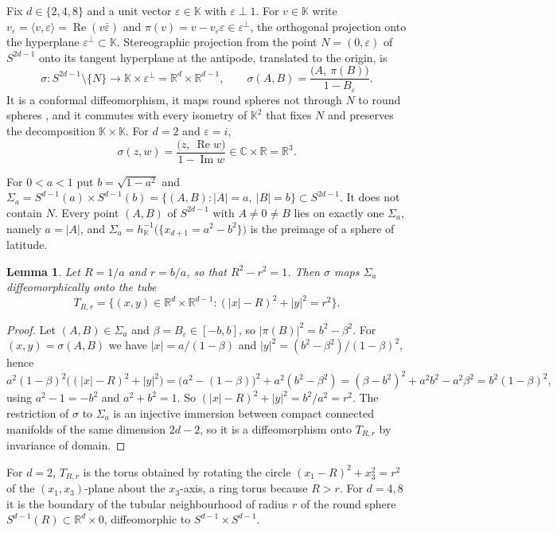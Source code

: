 \documentclass[11pt]{amsart}
\numberwithin{equation}{section}
\theoremstyle{plain}
\newtheorem{lemma}[theorem]{Lemma}
\theoremstyle{definition}
\theoremstyle{remark}
\newcommand{\R}{\mathbb{R}}
\newcommand{\C}{\mathbb{C}}
\newcommand{\K}{\mathbb{K}}
\newcommand{\Imag}{\operatorname{Im}}
\renewcommand{\Re}{\operatorname{Re}}
\begin{document}
Fix $d\in\{2,4,8\}$ and a unit vector $\varepsilon\in\K$ with $\varepsilon\perp1$. For $v\in\K$ write $v_\varepsilon=\langle v,\varepsilon\rangle=\Re(v\bar\varepsilon)$ and $\pi(v)=v-v_\varepsilon\varepsilon\in\varepsilon^\perp$, the orthogonal projection onto the hyperplane $\varepsilon^\perp\subset\K$. Stereographic projection from the point $N=(0,\varepsilon)$ of $S^{2d-1}$ onto its tangent hyperplane at the antipode, translated to the origin, is
\begin{equation}\label{eq:sigmaN}
\sigma\colon S^{2d-1}\setminus\{N\}\to\K\times\varepsilon^\perp=\R^d\times\R^{d-1},\qquad
\sigma(A,B)=\frac{\bigl(A,\ \pi(B)\bigr)}{1-B_\varepsilon}.
\end{equation}
It is a conformal diffeomorphism, it maps round spheres not through $N$ to round spheres \cite{Lyo03}, and it commutes with every isometry of $\K^2$ that fixes $N$ and preserves the decomposition $\K\times\K$. For $d=2$ and $\varepsilon=i$,
\[
\sigma(z,w)=\frac{\bigl(z,\ \Re w\bigr)}{1-\Imag w}\in\C\times\R=\R^3 .
\]

For $0<a<1$ put $b=\sqrt{1-a^2}$ and $\Sigma_a=S^{d-1}(a)\times S^{d-1}(b)=\{(A,B):|A|=a,\ |B|=b\}\subset S^{2d-1}$. It does not contain $N$. Every point $(A,B)$ of $S^{2d-1}$ with $A\neq0\neq B$ lies on exactly one $\Sigma_a$, namely $a=|A|$, and $\Sigma_a=h_\K^{-1}\bigl(\{x_{d+1}=a^2-b^2\}\bigr)$ is the preimage of a sphere of latitude.

\begin{lemma}\label{lem:tube}
Let $R=1/a$ and $r=b/a$, so that $R^2-r^2=1$. Then $\sigma$ maps $\Sigma_a$ diffeomorphically onto the tube
\[
T_{R,r}=\bigl\{(x,y)\in\R^d\times\R^{d-1}:(|x|-R)^2+|y|^2=r^2\bigr\}.
\]
\end{lemma}

\begin{proof}
Let $(A,B)\in\Sigma_a$ and $\beta=B_\varepsilon\in[-b,b]$, so $|\pi(B)|^2=b^2-\beta^2$. For $(x,y)=\sigma(A,B)$ we have $|x|=a/(1-\beta)$ and $|y|^2=(b^2-\beta^2)/(1-\beta)^2$, hence
\[
a^2(1-\beta)^2\bigl((|x|-R)^2+|y|^2\bigr)=\bigl(a^2-(1-\beta)\bigr)^2+a^2(b^2-\beta^2)=(\beta-b^2)^2+a^2b^2-a^2\beta^2=b^2(1-\beta)^2,
\]
using $a^2-1=-b^2$ and $a^2+b^2=1$. So $(|x|-R)^2+|y|^2=b^2/a^2=r^2$. The restriction of $\sigma$ to $\Sigma_a$ is an injective immersion between compact connected manifolds of the same dimension $2d-2$, so it is a diffeomorphism onto $T_{R,r}$ by invariance of domain.
\end{proof}

For $d=2$, $T_{R,r}$ is the torus obtained by rotating the circle $(x_1-R)^2+x_3^2=r^2$ of the $(x_1,x_3)$-plane about the $x_3$-axis, a ring torus because $R>r$. For $d=4,8$ it is the boundary of the tubular neighbourhood of radius $r$ of the round sphere $S^{d-1}(R)\subset\R^d\times0$, diffeomorphic to $S^{d-1}\times S^{d-1}$.
\end{document}
